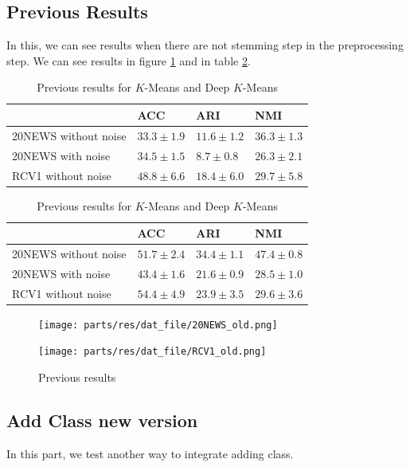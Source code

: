 \subsection{Previous Results}
In this, we can see results when there are not stemming step in 
the preprocessing step. We can see results in figure \ref{fig:previous} and in table \ref{tab:res_prev}.
\begin{table}[h]
\caption{\label{tab:res_prev}Previous results for $K$-Means and Deep $K$-Means}
\centering
  \begin{tabular}{|l|l|l|l|}
    \hline
    & ACC          &ARI           & NMI           \\ \hline
    20NEWS without noise   &$33.3 \pm 1.9$&$11.6 \pm 1.2$&$36.3 \pm 1.3$ \\ \hline
    20NEWS with noise      &$34.5 \pm 1.5$&$8.7 \pm 0.8$ &$26.3 \pm 2.1$ \\ \hline
    RCV1 without noise     &$48.8 \pm 6.6$&$18.4 \pm 6.0$&$29.7 \pm 5.8$ \\ \hline
  \end{tabular}
  \begin{tabular}{|l|l|l|l|}
    \hline
    & ACC          &ARI          & NMI          \\ \hline
    20NEWS without noise    & $51.7\pm 2.4$&$34.4\pm 1.1$&$47.4\pm 0.8$ \\ \hline
    20NEWS with noise       & $43.4\pm 1.6$&$21.6\pm 0.9$&$28.5\pm 1.0$ \\ \hline
    RCV1 without noise      &$54.4\pm 4.9$ &$23.9\pm 3.5$&$29.6\pm 3.6$ \\ \hline
  \end{tabular}
\end{table}
\begin{figure}[!h]
  \begin{minipage}{0.5\linewidth}
    \centering
    \texttt{[image: parts/res/dat\_file/20NEWS\_old.png]}     
  \end{minipage}
  \begin{minipage}{0.5\linewidth}
    \centering
    \texttt{[image: parts/res/dat\_file/RCV1\_old.png]}     
  \end{minipage}
  \caption{\label{fig:previous}Previous results}
\end{figure}
\subsection{Add Class new version}
In this part, we test another way to integrate adding class.
